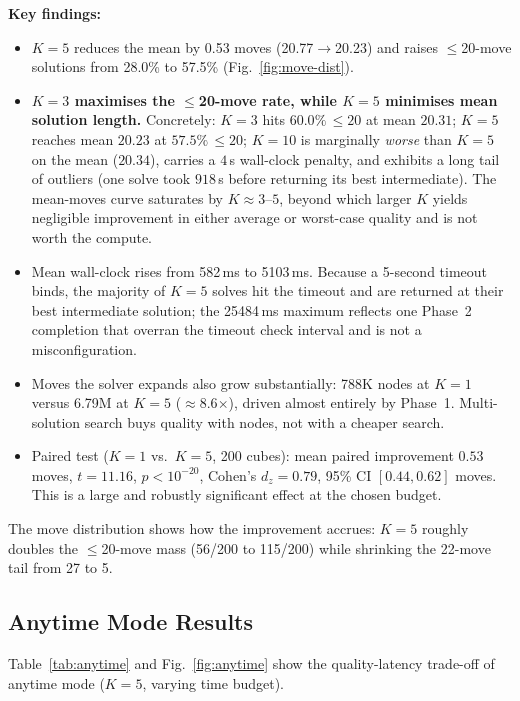 \documentclass[graybox]{svmult}
\begin{document}
\textbf{Key findings:}
\begin{itemize}[leftmargin=*]
  \item $K{=}5$ reduces the mean by 0.53 moves (20.77$\to$20.23) and raises $\leq$20-move solutions from 28.0\% to 57.5\% (Fig.~\ref{fig:move-dist}).
  \item \textbf{$K{=}3$ maximises the $\leq$20-move rate, while $K{=}5$ minimises mean solution length.} Concretely: $K{=}3$ hits $60.0\%\,{\leq}20$ at mean $20.31$; $K{=}5$ reaches mean $20.23$ at $57.5\%\,{\leq}20$; $K{=}10$ is marginally \emph{worse} than $K{=}5$ on the mean ($20.34$), carries a $4\,$s wall-clock penalty, and exhibits a long tail of outliers (one solve took $918$\,s before returning its best intermediate). The mean-moves curve saturates by $K{\approx}3$--$5$, beyond which larger $K$ yields negligible improvement in either average or worst-case quality and is not worth the compute.
  \item Mean wall-clock rises from 582\,ms to 5103\,ms. Because a 5-second timeout binds, the majority of $K{=}5$ solves hit the timeout and are returned at their best intermediate solution; the 25484\,ms maximum reflects one Phase~2 completion that overran the timeout check interval and is not a misconfiguration.
  \item Moves the solver expands also grow substantially: 788K nodes at $K{=}1$ versus 6.79M at $K{=}5$ ($\approx$8.6$\times$), driven almost entirely by Phase~1. Multi-solution search buys quality with nodes, not with a cheaper search.
  \item Paired test ($K{=}1$ vs.\ $K{=}5$, 200 cubes): mean paired improvement $0.53$ moves, $t = 11.16$, $p < 10^{-20}$, Cohen's $d_z = 0.79$, 95\% CI $[0.44, 0.62]$ moves. This is a large and robustly significant effect at the chosen budget.
\end{itemize}

The move distribution shows how the improvement accrues: $K{=}5$ roughly doubles the $\leq$20-move mass (56/200 to 115/200) while shrinking the 22-move tail from 27 to 5.

\subsection{Anytime Mode Results}

Table~\ref{tab:anytime} and Fig.~\ref{fig:anytime} show the quality-latency trade-off of anytime mode ($K{=}5$, varying time budget).
\end{document}
